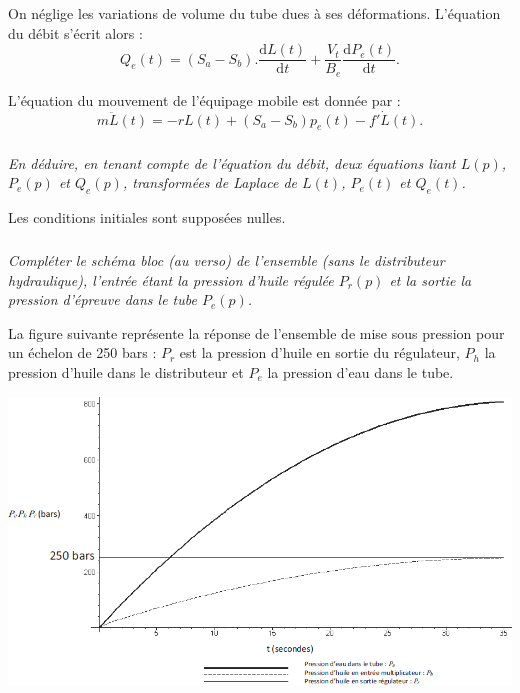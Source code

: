 \documentclass[10pt,fleqn]{article} %
\begin{document}
\begin{multicols}{2}
On néglige les variations de volume du tube dues à ses déformations. L’équation du débit s’écrit alors :
	$$Q_e (t)=(S_a-S_b ).\dfrac{\text{d}L(t)}{\text{d}t}+\dfrac{V_t}{B_e}  \dfrac{\text{d}P_e (t)}{\text{d}t}.$$
	
%	


L’équation du mouvement de l’équipage mobile est donnée par : 
$$
m\ddot{L}(t)=-rL(t)+\left(S_a-S_b \right)p_e(t)-f'\dot{L}(t).
$$

\subparagraph{}
\textit{En déduire, en tenant compte de l’équation du débit, deux équations liant $L(p)$, $P_e(p)$ et $Q_e(p)$, transformées de Laplace de $L(t)$, $P_e(t)$ et $Q_e(t)$. }

Les conditions initiales sont supposées nulles.

\subparagraph{}
\textit{Compléter le schéma bloc (au verso) de l’ensemble (sans le distributeur hydraulique), l’entrée étant la pression d’huile régulée $P_r(p)$ et la sortie la pression d’épreuve dans le tube $P_e(p)$.}



La figure suivante représente la réponse de l’ensemble de mise sous pression pour un échelon de 250 bars : $P_r$ est la pression d’huile en sortie du régulateur, $P_h$ la pression d’huile dans le distributeur et $P_e$ la pression d’eau dans le tube.

\begin{center}
\includegraphics[width=\linewidth]{images_02/fig_04}
\end{center}


\end{multicols}
\end{document}
